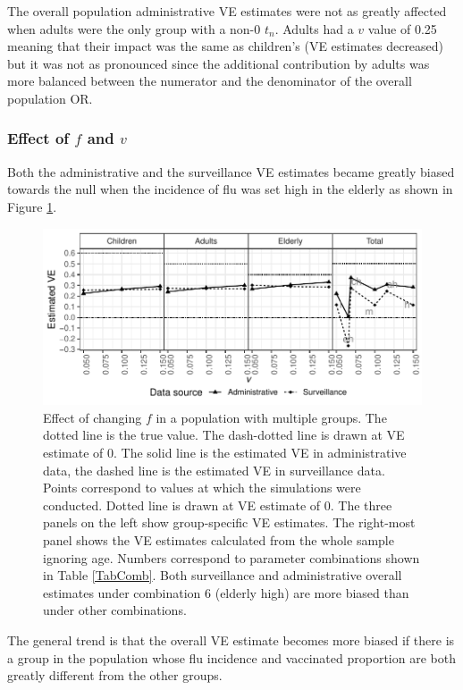 \documentclass[11pt]{article}
\begin{document}
The overall population administrative VE estimates were not as greatly affected when adults were the only group with a non-0 $t_n$. Adults had a $v$ value of 0.25 meaning that their impact was the same as children's (VE estimates decreased) but it was not as pronounced since the additional contribution by adults was more balanced between the numerator and the denominator of the overall population OR.

\pagebreak
\subsubsection{Effect of $f$ and $v$}

Both the administrative and the surveillance VE estimates became greatly biased towards the null when the incidence of flu was set high in the elderly as shown in Figure \ref{fig:agesmult-pflu}.

\begin{figure}[h]
	\centering
		\includegraphics[width=1\linewidth]{../fig-agesmult/agesmult-pflu.pdf}
		\caption{
Effect of changing $f$ in a population with multiple groups. The dotted line is the true value. The dash-dotted line is drawn at VE estimate of 0. The solid line is the estimated VE in administrative data, the dashed line is the estimated VE in surveillance data. Points correspond to values at which the simulations were conducted. Dotted line is drawn at VE estimate of 0. The three panels on the left show group-specific VE estimates. The right-most panel shows the VE estimates calculated from the whole sample ignoring age. Numbers correspond to parameter combinations shown in Table \ref{TabComb}. Both surveillance and administrative overall estimates under combination 6 (elderly high) are more biased than under other combinations. \label{fig:agesmult-pflu}
		}
\end{figure}

The general trend is that the overall VE estimate becomes more biased if there is a group in the population whose flu incidence and vaccinated proportion are both greatly different from the other groups.
\end{document}
